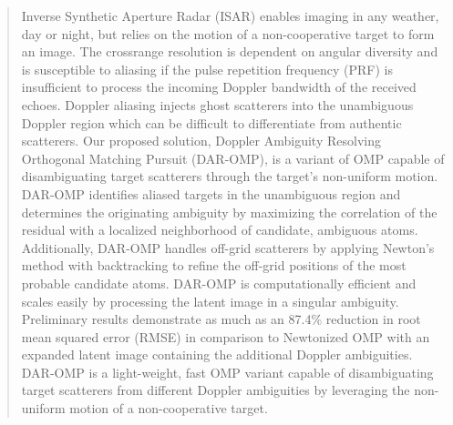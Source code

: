 \begin{abstract}
Inverse Synthetic Aperture Radar (ISAR) enables imaging in any weather, day or night, but relies on the motion of a non-cooperative target to form an image. The crossrange resolution is dependent on angular diversity and is susceptible to aliasing if the pulse repetition frequency (PRF) is insufficient to process the incoming Doppler bandwidth of the received echoes. Doppler aliasing injects ghost scatterers into the unambiguous Doppler region which can be difficult to differentiate from authentic scatterers. Our proposed solution, Doppler Ambiguity Resolving Orthogonal Matching Pursuit (DAR-OMP), is a variant of OMP capable of disambiguating target scatterers through the target's non-uniform motion. DAR-OMP identifies aliased targets in the unambiguous region and determines the originating ambiguity by maximizing the correlation of the residual with a localized neighborhood of candidate, ambiguous atoms. Additionally, DAR-OMP handles off-grid scatterers by applying Newton’s method with backtracking to refine the off-grid positions of the most probable candidate atoms. DAR-OMP is computationally efficient and scales easily by processing the latent image in a singular ambiguity. Preliminary results demonstrate as much as an 87.4\% reduction in root mean squared error (RMSE) in comparison to Newtonized OMP with an expanded latent image containing the additional Doppler ambiguities. DAR-OMP is a light-weight, fast OMP variant capable of disambiguating target scatterers from different Doppler ambiguities by leveraging the non-uniform motion of a non-cooperative target.
\end{abstract}

